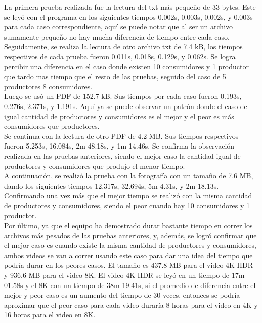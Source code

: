 \documentclass[12pt, article, natbib]{IEEEtran}
\begin{document}
La primera prueba realizada fue la lectura del txt más pequeño de 33 bytes. Este se leyó con el programa en los siguientes tiempos 0.002s, 0.003s, 0.002s, y 0.003s para cada caso correspondiente, aquí se puede notar que al ser un archivo sumamente pequeño no hay mucha diferencia de tiempo entre cada caso.
Seguidamente, se realiza la lectura de otro archivo txt de 7.4 kB, los tiempos respectivos de cada prueba fueron 0.011s, 0.018s, 0.129s, y 0.062s. Se logra percibir una diferencia en el caso donde existen 10 consumidores y 1 productor que tardo mas tiempo que el resto de las pruebas, seguido del caso de 5 productores 8 consumidores.\\

Luego se usó un PDF de 152.7 kB. Sus tiempos por cada caso fueron 0.193s, 0.276s, 2.371s, y 1.191s. Aquí ya se puede observar un patrón donde el caso de igual cantidad de productores y consumidores es el mejor y el peor es más consumidores que productores.\\

Se continua con la lectura de otro PDF de 4.2 MB. Sus tiempos respectivos fueron 5.253s, 16.084s, 2m 48.18s, y 1m 14.46s. Se confirma la observación realizada en las pruebas anteriores, siendo el mejor caso la cantidad igual de productores y consumidores que produjo el menor tiempo.\\

A continuación, se realizó la prueba con la fotografía con un tamaño de 7.6 MB, dando los siguientes tiempos 12.317s, 32.694s, 5m 4.31s, y 2m 18.13s. Confirmando una vez más que el mejor tiempo se realizó con la misma cantidad de productores y consumidores, siendo el peor cuando hay 10 consumidores y 1 productor.\\

Por último, ya que el equipo ha demostrado durar bastante tiempo en correr los archivos más pesados de las pruebas anteriores, y, además, se logró confirmar que el mejor caso es cuando existe la misma cantidad de productores y consumidores, ambos videos se van a correr usando este caso para dar una idea del tiempo que podría durar en los peores casos. El tamaño es 437.8 MB para el video 4K HDR y 936,6 MB para el video 8K. El video 4K HDR se leyó en un tiempo de 17m 01.58s y el 8K con un tiempo de 38m 19.41s, si el promedio de diferencia entre el mejor y peor caso es un aumento del tiempo de 30 veces, entonces se podría aproximar que el peor caso para cada video duraría 8 horas para el video en 4K y 16 horas para el video en 8K.\\
\end{document}
